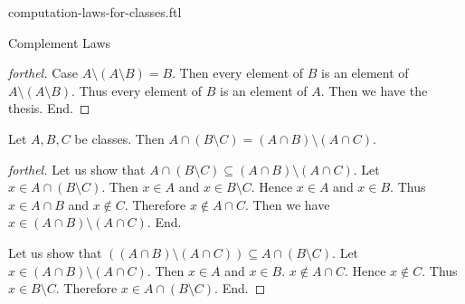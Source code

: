 \documentclass{naproche-library}
\begin{document}
\begin{smodule}[title=Computation Laws For Classes]{computation-laws-for-classes.ftl}
\begin{sfragment}{Complement Laws}
\begin{proof}[forthel]
    Case $A \setminus (A \setminus B) = B$.
      Then every element of $B$ is an element of $A \setminus (A \setminus B)$.
      Thus every element of $B$ is an element of $A$.
      Then we have the thesis.
    End.
  \end{proof}

  \begin{proposition}[forthel,id=FOUNDATIONS_02_5811954316738560]
    Let $A, B, C$ be classes.
    Then $A \cap (B \setminus C) = (A \cap B) \setminus (A \cap C)$.
  \end{proposition}
  \begin{proof}[forthel]
    Let us show that $A \cap (B \setminus C) \subseteq (A \cap B) \setminus (A \cap C)$.
      Let $x \in A \cap (B \setminus C)$.
      Then $x \in A$ and $x \in B \setminus C$.
      Hence $x \in A$ and $x \in B$.
      Thus $x \in A \cap B$ and $x \notin C$.
      Therefore $x \notin A \cap C$.
      Then we have $x \in (A \cap B) \setminus (A \cap C)$.
    End.

    Let us show that $((A \cap B) \setminus (A \cap C)) \subseteq A \cap (B \setminus C)$. %
      Let $x \in (A \cap B) \setminus (A \cap C)$.
      Then $x \in A$ and $x \in B$.
      $x \notin A \cap C$.
      Hence $x \notin C$.
      Thus $x \in B \setminus C$.
      Therefore $x \in A \cap (B \setminus C)$.
    End.
  \end{proof}
\end{sfragment}
\end{smodule}
\end{document}
